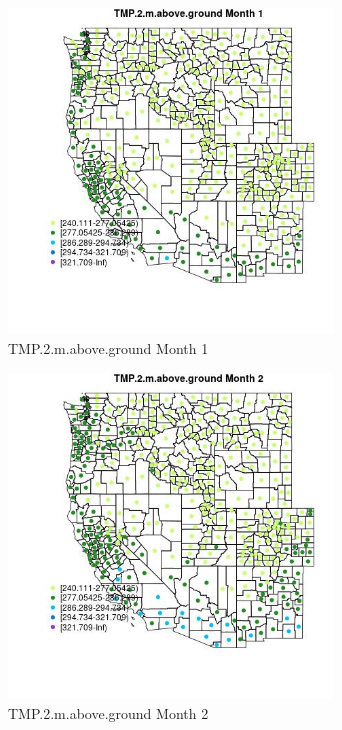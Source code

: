 \begin{figure} 
\centering  
\includegraphics[width=0.77\textwidth]{Code_Outputs/df_report_ML_predictors_CountyCentroid_Locations_Dates_2008-01-01to2018-12-31_MapObsMo1TMP2maboveground.jpg} 
\caption{\label{fig:df_report_ML_predictors_CountyCentroid_Locations_Dates_2008-01-01to2018-12-31MapObsMo1TMP2maboveground}TMP.2.m.above.ground Month 1} 
\end{figure} 
 

\begin{figure} 
\centering  
\includegraphics[width=0.77\textwidth]{Code_Outputs/df_report_ML_predictors_CountyCentroid_Locations_Dates_2008-01-01to2018-12-31_MapObsMo2TMP2maboveground.jpg} 
\caption{\label{fig:df_report_ML_predictors_CountyCentroid_Locations_Dates_2008-01-01to2018-12-31MapObsMo2TMP2maboveground}TMP.2.m.above.ground Month 2} 
\end{figure} 
 

